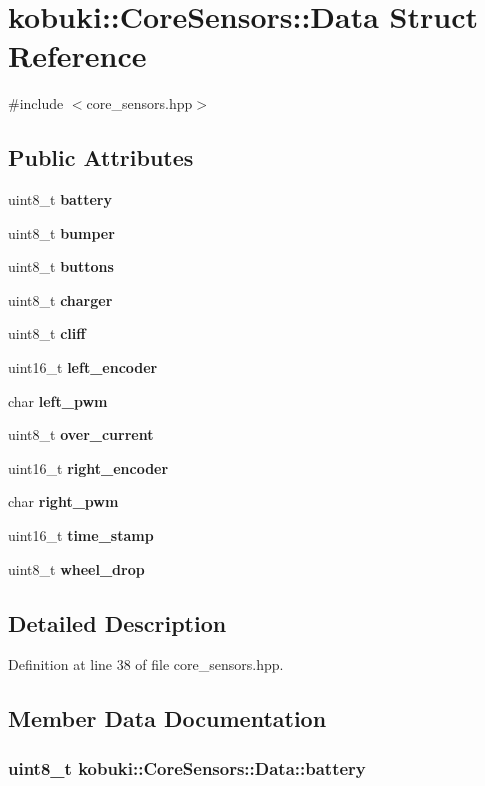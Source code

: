 \section{kobuki\-:\-:\-Core\-Sensors\-:\-:\-Data \-Struct \-Reference}
\label{structkobuki_1_1CoreSensors_1_1Data}


{\ttfamily \#include $<$core\-\_\-sensors.\-hpp$>$}

\subsection*{\-Public \-Attributes}
\begin{DoxyCompactItemize}
\item 
uint8\-\_\-t {\bf battery}
\item 
uint8\-\_\-t {\bf bumper}
\item 
uint8\-\_\-t {\bf buttons}
\item 
uint8\-\_\-t {\bf charger}
\item 
uint8\-\_\-t {\bf cliff}
\item 
uint16\-\_\-t {\bf left\-\_\-encoder}
\item 
char {\bf left\-\_\-pwm}
\item 
uint8\-\_\-t {\bf over\-\_\-current}
\item 
uint16\-\_\-t {\bf right\-\_\-encoder}
\item 
char {\bf right\-\_\-pwm}
\item 
uint16\-\_\-t {\bf time\-\_\-stamp}
\item 
uint8\-\_\-t {\bf wheel\-\_\-drop}
\end{DoxyCompactItemize}


\subsection{\-Detailed \-Description}


\-Definition at line 38 of file core\-\_\-sensors.\-hpp.



\subsection{\-Member \-Data \-Documentation}
\subsubsection[{battery}]{\setlength{\rightskip}{0pt plus 5cm}uint8\-\_\-t {\bf kobuki\-::\-Core\-Sensors\-::\-Data\-::battery}}\label{structkobuki_1_1CoreSensors_1_1Data_a6e2d199ac9856efb0da581cac93b9efe}



